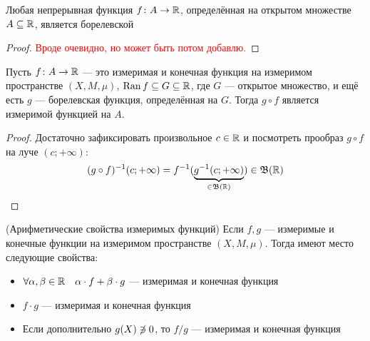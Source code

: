 \begin{proposition}
	Любая непрерывная функция $f \colon A \to \mathbb{R}$, определённая на открытом множестве $A \subseteq \mathbb{R}$, является борелевской
\end{proposition}

\begin{proof}
	\textcolor{red}{Вроде очевидно, но может быть потом добавлю.}
\end{proof}

\begin{theorem}
	Пусть $f \colon A \to \mathbb{R}$ --- это измеримая и конечная функция на измеримом пространстве $(X, M, \mu)$, $\operatorname{Ran} f \subseteq G \subseteq \mathbb{R}$, где $G$ --- открытое множество, и ещё есть $g$ --- борелевская функция, определённая на $G$. Тогда $g \circ f$ является измеримой функцией на $A$.
\end{theorem}

\begin{proof}
	Достаточно зафиксировать произвольное $c \in \mathbb{R}$ и посмотреть прообраз $g \circ f$ на луче $(c; +\infty)$:
	\[
		(g \circ f)^{-1}(c; +\infty) = f^{-1}(\underbrace{g^{-1}(c; +\infty)}_{\in \mathfrak{B}(\mathbb{R})}) \in \mathfrak{B}(\mathbb{R})
	\]
\end{proof}

\begin{theorem} (Арифметические свойства измеримых функций)
	Если $f, g$ --- измеримые и конечные функции на измеримом пространстве $(X, M, \mu)$. Тогда имеют место следующие свойства:
	\begin{itemize}
		\item $\forall \alpha, \beta \in \mathbb{R} \quad \alpha \cdot f + \beta \cdot g$ --- измеримая и конечная функция
		
		\item $f \cdot g$ --- измеримая и конечная функция
		
		\item Если дополнительно $g(X) \centernot\ni 0$, то $f / g$ --- измеримая и конечная функция
	\end{itemize}
\end{theorem}

